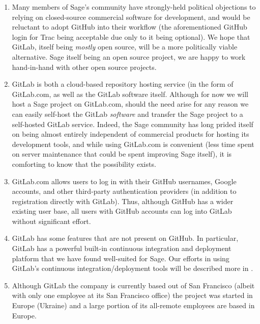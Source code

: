 \begin{enumerate}
\item Many members of Sage's community have strongly-held political objections
    to relying on closed-source commercial software for development, and would
    be reluctant to adopt GitHub into their workflow (the aforementioned GitHub
    login for Trac being acceptable due only to it being optional).  We hope
    that GitLab, itself being {\em mostly} open source, will be a more
    politically viable alternative. Sage itself being an open source project,
    we are happy to work hand-in-hand with other open source projects.
\item GitLab is both a cloud-based repository hosting service (in the form of
    GitLab.com, as well as the GitLab software itself.  Although for now we
    will host a Sage project on GitLab.com, should the need arise for any
    reason we can easily self-host the GitLab {\em software} and transfer the
    Sage project to a self-hosted GitLab service. Indeed, the Sage community
    has long prided itself on being almost entirely independent of commercial
    products for hosting its development tools, and while using GitLab.com is
    convenient (less time spent on server maintenance that could be spent
    improving Sage itself), it is comforting to know that the possibility
    exists.
\item GitLab.com allows users to log in with their GitHub usernames, Google
    accounts, and other third-party authentication providers (in addition to
    registration directly with GitLab).  Thus, although GitHub has a wider
    existing user base, all users with GitHub accounts can log into GitLab
    without significant effort.
\item GitLab has some features that are not present on GitHub.  In particular,
    GitLab has a powerful built-in continuous integration and deployment
    platform that we have found well-suited for Sage.  Our efforts in using
    GitLab's continuous integration/deployment tools will be described more
    in .
\item Although GitLab the company is currently based out of San Francisco
    (albeit with only one employee at its San Francisco office) the project
    was started in Europe (Ukraine) and a large portion of its all-remote
    employees are based in Europe.
\end{enumerate}

